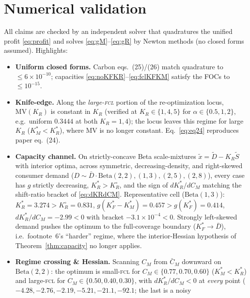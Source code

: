 \documentclass[11pt,reqno]{amsart}
\theoremstyle{plain}
\theoremstyle{definition}
\theoremstyle{remark}
\newcommand{\KR}{K_R}
\newcommand{\KRs}{K_R^{*}}
\newcommand{\KFs}{K_F^{*}}
\newcommand{\KMs}{K_M^{*}}
\newcommand{\KRo}{K_R^{\circ}}
\newcommand{\Dbar}{\bar D}
\newcommand{\CM}{C_M}
\newcommand{\CMbar}{\bar C_M}
\begin{document}
\section{Numerical validation}\label{sec:num}

All claims are checked by an independent solver that quadratures the unified
profit \eqref{eq:profit} and solves \eqref{eq:gM}--\eqref{eq:gR} by Newton
methods (no closed forms assumed). Highlights:
\begin{itemize}[leftmargin=1.6em]
  \item \textbf{Uniform closed forms.} Carbon eqs.\ (25)/(26) match quadrature to
        $\le 6\times10^{-10}$; capacities \eqref{eq:noKFKR}--\eqref{eq:fclKFKM}
        satisfy the FOCs to $\le 10^{-15}$.
  \item \textbf{Knife-edge.} Along the \emph{large-\textsc{fcl}} portion of the
        re-optimization locus, $\mathrm{MV}(\KR)$ is constant in $\KR$ (verified at
        $\KR\in\{1,4,5\}$ for $\alpha\in\{0.5,1,2\}$, e.g.\ uniform $0.3444$ at
        both $\KR=1,4$); the locus leaves this regime for large $\KR$
        ($\KMs<\KRs$), where $\mathrm{MV}$ is no longer constant. Eq.\
        \eqref{eq:eq24} reproduces paper eq.\ (24).
  \item \textbf{Capacity channel.} On strictly-concave Beta scale-mixtures
        $\tilde x=\tilde D-\KR\tilde S$ with interior optima, across symmetric,
        decreasing-density, and right-skewed consumer demand
        ($D\sim\Dbar\cdot\mathrm{Beta}(2,2),(1,3),(2,5),(2,8)$), every case has
        $g$ strictly decreasing, $\KRs>\KRo$, and the sign of $d\KRs/d\CM$
        matching the shift-ratio bracket of \eqref{eq:dKRdCM}. Representative
        cell ($\mathrm{Beta}(1,3)$): $\KRs=3.274>\KRo=0.831$,
        $g(\KFs-\KMs)=0.457>g(\KFs)=0.414$, $d\KRs/d\CM=-2.99<0$ with bracket
        $-3.1\times10^{-4}<0$. Strongly left-skewed demand pushes the optimum to
        the full-coverage boundary ($\KFs\!\to\!\Dbar$), i.e.\ footnote~6's
        ``harder'' regime, where the interior-Hessian hypothesis of
        Theorem~\ref{thm:capacity} no longer applies.
  \item \textbf{Regime crossing \& Hessian.} Scanning $\CM$ from $\CMbar$ downward
        on $\mathrm{Beta}(2,2)$: the optimum is small-\textsc{fcl} for
        $\CM\in\{0.77,0.70,0.60\}$ ($\KMs<\KRs$) and large-\textsc{fcl} for
        $\CM\in\{0.50,0.40,0.30\}$, with $d\KRs/d\CM<0$ at \emph{every} point
        ($-4.28,-2.76,-2.19,-5.21,-21.1,-92.1$; the last is a noisy

\end{itemize}
\end{document}
